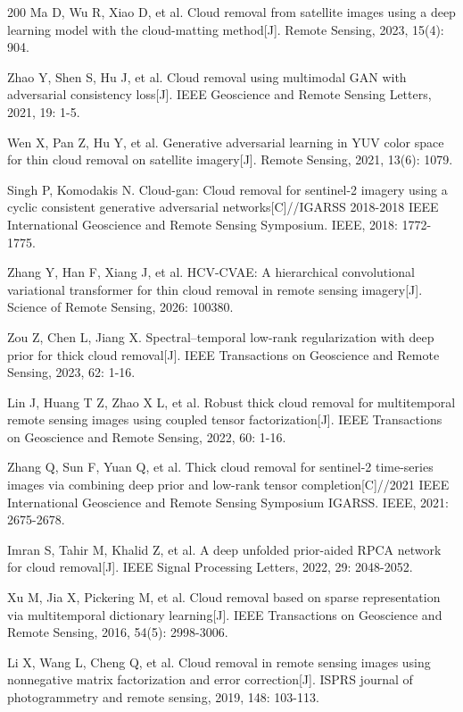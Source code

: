 \begin{thebibliography}{200}
Ma D, Wu R, Xiao D, et al. Cloud removal from satellite images using a deep learning model with the cloud-matting method[J]. Remote Sensing, 2023, 15(4): 904.

Zhao Y, Shen S, Hu J, et al. Cloud removal using multimodal GAN with adversarial consistency loss[J]. IEEE Geoscience and Remote Sensing Letters, 2021, 19: 1-5.

Wen X, Pan Z, Hu Y, et al. Generative adversarial learning in YUV color space for thin cloud removal on satellite imagery[J]. Remote Sensing, 2021, 13(6): 1079.

Singh P, Komodakis N. Cloud-gan: Cloud removal for sentinel-2 imagery using a cyclic consistent generative adversarial networks[C]//IGARSS 2018-2018 IEEE International Geoscience and Remote Sensing Symposium. IEEE, 2018: 1772-1775.

Zhang Y, Han F, Xiang J, et al. HCV-CVAE: A hierarchical convolutional variational transformer for thin cloud removal in remote sensing imagery[J]. Science of Remote Sensing, 2026: 100380.

Zou Z, Chen L, Jiang X. Spectral–temporal low-rank regularization with deep prior for thick cloud removal[J]. IEEE Transactions on Geoscience and Remote Sensing, 2023, 62: 1-16.

Lin J, Huang T Z, Zhao X L, et al. Robust thick cloud removal for multitemporal remote sensing images using coupled tensor factorization[J]. IEEE Transactions on Geoscience and Remote Sensing, 2022, 60: 1-16.

Zhang Q, Sun F, Yuan Q, et al. Thick cloud removal for sentinel-2 time-series images via combining deep prior and low-rank tensor completion[C]//2021 IEEE International Geoscience and Remote Sensing Symposium IGARSS. IEEE, 2021: 2675-2678.

Imran S, Tahir M, Khalid Z, et al. A deep unfolded prior-aided RPCA network for cloud removal[J]. IEEE Signal Processing Letters, 2022, 29: 2048-2052.

Xu M, Jia X, Pickering M, et al. Cloud removal based on sparse representation via multitemporal dictionary learning[J]. IEEE Transactions on Geoscience and Remote Sensing, 2016, 54(5): 2998-3006.

Li X, Wang L, Cheng Q, et al. Cloud removal in remote sensing images using nonnegative matrix factorization and error correction[J]. ISPRS journal of photogrammetry and remote sensing, 2019, 148: 103-113.


\end{thebibliography}
